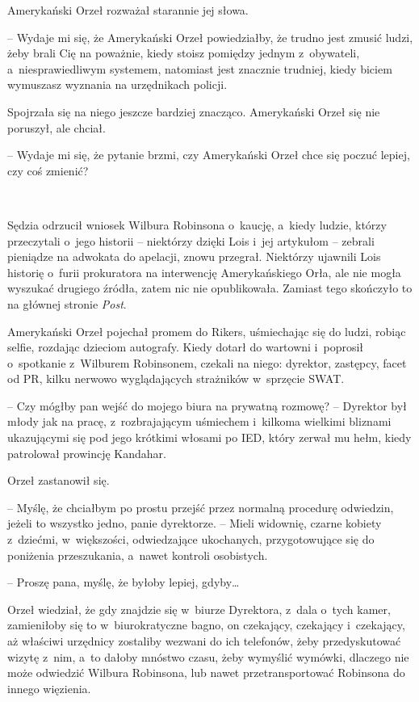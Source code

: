 \documentclass[oneside,polish,11pt,sfheadings]{mwbk}
\begin{document}
Amerykański Orzeł rozważał starannie jej słowa. 

-- Wydaje mi się, że
Amerykański Orzeł powiedziałby, że trudno jest zmusić ludzi, żeby brali
Cię na poważnie, kiedy stoisz pomiędzy jednym z~obywateli, a~niesprawiedliwym systemem, natomiast jest znacznie trudniej, kiedy
biciem wymuszasz wyznania na urzędnikach policji.

Spojrzała się na niego jeszcze bardziej znacząco. Amerykański Orzeł się
nie poruszył, ale chciał.

-- Wydaje mi się, że pytanie brzmi, czy Amerykański Orzeł chce się poczuć
lepiej, czy coś zmienić?

~

Sędzia odrzucił wniosek Wilbura Robinsona o~kaucję, a~kiedy ludzie,
którzy przeczytali o~jego historii -- niektórzy dzięki Lois i~jej
artykułom -- zebrali pieniądze na adwokata do apelacji, znowu przegrał.
Niektórzy ujawnili Lois historię o~furii prokuratora na interwencję
Amerykańskiego Orła, ale nie mogła wyszukać drugiego źródła, zatem nic
nie opublikowała. Zamiast tego skończyło to na głównej stronie
\textit{Post}.

Amerykański Orzeł pojechał promem do Rikers, uśmiechając się do ludzi,
robiąc selfie, rozdając dzieciom autografy. Kiedy dotarł do wartowni i~poprosił o~spotkanie z~Wilburem Robinsonem, czekali na niego: dyrektor,
zastępcy, facet od PR, kilku nerwowo wyglądających strażników w~sprzęcie
SWAT.

-- Czy mógłby pan wejść do mojego biura na prywatną rozmowę? -- Dyrektor
był młody jak na pracę, z~rozbrajającym uśmiechem i~kilkoma wielkimi
bliznami ukazującymi się pod jego krótkimi włosami po IED, który zerwał
mu hełm, kiedy patrolował prowincję Kandahar.

Orzeł zastanowił się. 

-- Myślę, że chciałbym po prostu przejść przez
normalną procedurę odwiedzin, jeżeli to wszystko jedno, panie
dyrektorze. -- Mieli widownię, czarne kobiety z~dziećmi, w~większości,
odwiedzające ukochanych, przygotowujące się do poniżenia przeszukania, a~nawet kontroli osobistych.

-- Proszę pana, myślę, że byłoby lepiej, gdyby\ldots 

Orzeł wiedział, że gdy znajdzie się w~biurze Dyrektora, z~dala o~tych
kamer, zamieniłoby się to w~biurokratyczne bagno, on czekający,
czekający i~czekający, aż właściwi urzędnicy zostaliby wezwani do ich
telefonów, żeby przedyskutować wizytę z~nim, a~to dałoby mnóstwo czasu,
żeby wymyślić wymówki, dlaczego nie może odwiedzić Wilbura Robinsona,
lub nawet przetransportować Robinsona do innego więzienia.
\end{document}
